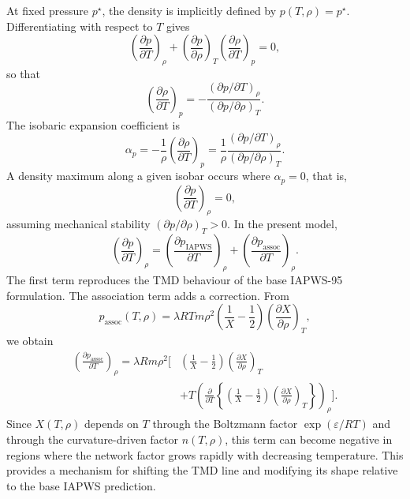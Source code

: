\documentclass[12pt]{article}
\begin{document}
At fixed pressure $p^\star$, the density is implicitly defined by $p(T,\rho)=p^\star$. Differentiating with respect to $T$ gives
\begin{equation}
  \left(\frac{\partial p}{\partial T}\right)_\rho+\left(\frac{\partial p}{\partial\rho}\right)_T\left(\frac{\partial\rho}{\partial T}\right)_p=0,
\end{equation}
so that
\begin{equation}
  \left(\frac{\partial\rho}{\partial T}\right)_p=-\frac{(\partial p/\partial T)_\rho}{(\partial p/\partial\rho)_T}.
\end{equation}
The isobaric expansion coefficient is
\begin{equation}
  \alpha_p=-\frac{1}{\rho}\left(\frac{\partial\rho}{\partial T}\right)_p=\frac{1}{\rho}\frac{(\partial p/\partial T)_\rho}{(\partial p/\partial\rho)_T}.
\end{equation}
A density maximum along a given isobar occurs where $\alpha_p=0$, that is,
\begin{equation}
  \left(\frac{\partial p}{\partial T}\right)_\rho=0,
\end{equation}
assuming mechanical stability $(\partial p/\partial\rho)_T>0$. In the present model,
\begin{equation}
  \left(\frac{\partial p}{\partial T}\right)_\rho=\left(\frac{\partial p_{\mathrm{IAPWS}}}{\partial T}\right)_\rho+\left(\frac{\partial p_{\mathrm{assoc}}}{\partial T}\right)_\rho.
\end{equation}
The first term reproduces the TMD behaviour of the base IAPWS-95 formulation. The association term adds a correction. From
\begin{equation}
  p_{\mathrm{assoc}}(T,\rho)=\lambda RTm\rho^2\left(\frac{1}{X}-\frac{1}{2}\right)\left(\frac{\partial X}{\partial\rho}\right)_T,
\end{equation}
we obtain
\begin{equation}
\begin{split}
  \left(\frac{\partial p_{\mathrm{assoc}}}{\partial T}\right)_\rho
  =\lambda Rm\rho^2\Bigg[&\left(\frac{1}{X}-\frac{1}{2}\right)\left(\frac{\partial X}{\partial\rho}\right)_T\\
  &+T\left(\frac{\partial}{\partial T}\left\{\left(\frac{1}{X}-\frac{1}{2}\right)\left(\frac{\partial X}{\partial\rho}\right)_T\right\}\right)_\rho\Bigg].
\end{split}
\end{equation}
Since $X(T,\rho)$ depends on $T$ through the Boltzmann factor $\exp(\varepsilon/RT)$ and through the curvature-driven factor $n(T,\rho)$, this term can become negative in regions where the network factor grows rapidly with decreasing temperature. This provides a mechanism for shifting the TMD line and modifying its shape relative to the base IAPWS prediction.
\end{document}
